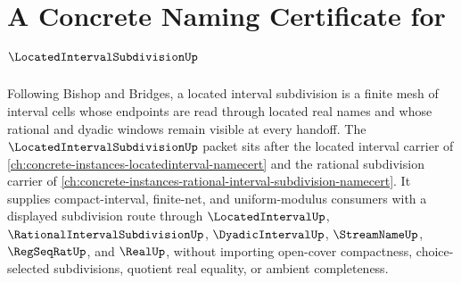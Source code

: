 \chapter{A Concrete Naming Certificate for $\LocatedIntervalSubdivisionUp$}
\label{ch:concrete-instances-located-interval-subdivision-namecert}

Following Bishop and Bridges, a located interval subdivision is a finite mesh of interval cells whose endpoints are read through located real names and whose rational and dyadic windows remain visible at every handoff. The $\LocatedIntervalSubdivisionUp$ packet sits after the located interval carrier of \autoref{ch:concrete-instances-locatedinterval-namecert} and the rational subdivision carrier of \autoref{ch:concrete-instances-rational-interval-subdivision-namecert}. It supplies compact-interval, finite-net, and uniform-modulus consumers with a displayed subdivision route through $\LocatedIntervalUp$, $\RationalIntervalSubdivisionUp$, $\DyadicIntervalUp$, $\StreamNameUp$, $\RegSeqRatUp$, and $\RealUp$, without importing open-cover compactness, choice-selected subdivisions, quotient real equality, or ambient completeness.

